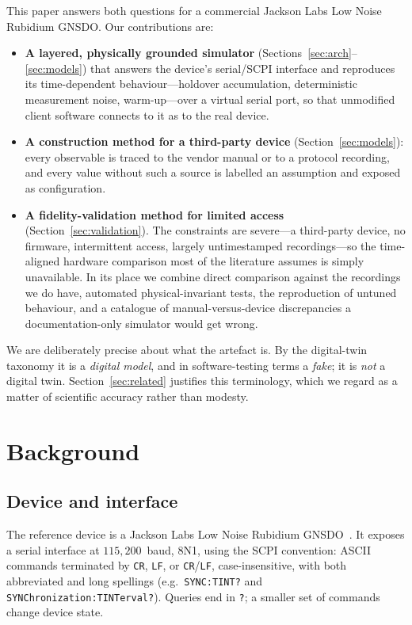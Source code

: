 \documentclass[conference]{IEEEtran}
\begin{document}
This paper answers both questions for a commercial Jackson Labs Low
Noise Rubidium GNSDO. Our contributions are:
\begin{itemize}
\item \textbf{A layered, physically grounded simulator}
(Sections~\ref{sec:arch}--\ref{sec:models}) that answers the device's
serial/SCPI interface and reproduces its time-dependent
behaviour---holdover accumulation, deterministic measurement noise,
warm-up---over a virtual serial port, so that unmodified client
software connects to it as to the real device.
\item \textbf{A construction method for a third-party device}
(Section~\ref{sec:models}): every observable is traced to the vendor
manual or to a protocol recording, and every value without such a
source is labelled an assumption and exposed as configuration.
\item \textbf{A fidelity-validation method for limited access}
(Section~\ref{sec:validation}). The constraints are severe---a
third-party device, no firmware, intermittent access, largely
untimestamped recordings---so the time-aligned hardware comparison most
of the literature assumes is simply unavailable. In its place we
combine direct comparison against the recordings we do have, automated
physical-invariant tests, the reproduction of untuned behaviour, and a
catalogue of manual-versus-device discrepancies a documentation-only
simulator would get wrong.
\end{itemize}

We are deliberately precise about what the artefact is. By the
digital-twin taxonomy it is a \emph{digital model}, and in
software-testing terms a \emph{fake}; it is \emph{not} a digital twin.
Section~\ref{sec:related} justifies this terminology, which we regard as
a matter of scientific accuracy rather than modesty.

\section{Background}
\label{sec:background}
\subsection{Device and interface}
The reference device is a Jackson Labs Low Noise Rubidium
GNSDO~\cite{jacksonlabs2015lnrb}. It exposes a serial interface at
$115{,}200$~baud, 8N1, using the SCPI convention: ASCII commands
terminated by \texttt{CR}, \texttt{LF}, or \texttt{CR}/\texttt{LF},
case-insensitive, with both abbreviated and long spellings
(e.g.\ \texttt{SYNC:TINT?} and \texttt{SYNChronization:TINTerval?}).
Queries end in \texttt{?}; a smaller set of commands change device
state.
\end{document}
